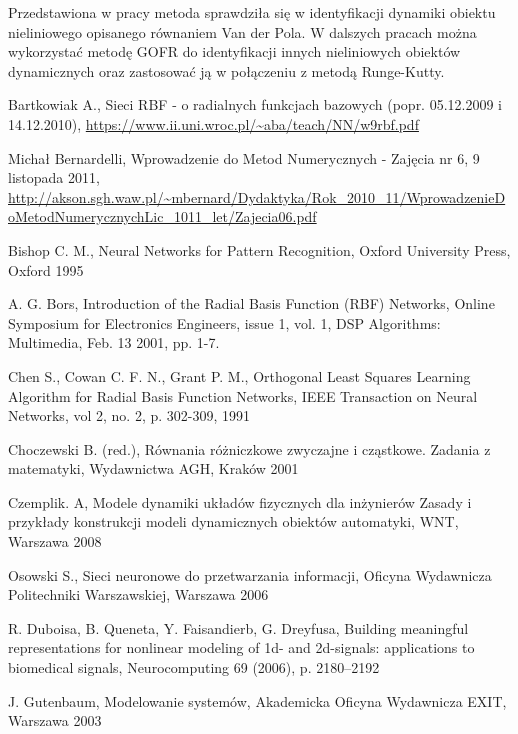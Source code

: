 Przedstawiona w pracy metoda sprawdziła się w identyfikacji dynamiki obiektu nieliniowego opisanego równaniem Van der Pola. W dalszych pracach można wykorzystać metodę GOFR do identyfikacji innych nieliniowych obiektów dynamicznych oraz zastosować ją w połączeniu z metodą Runge-Kutty\cite{Wang}.

\clearpage

\begin{thebibliography}{widest-label}

 Bartkowiak A., Sieci RBF - o radialnych funkcjach bazowych (popr. 05.12.2009 i 14.12.2010), \url{https://www.ii.uni.wroc.pl/~aba/teach/NN/w9rbf.pdf}

 Michał Bernardelli, Wprowadzenie do Metod Numerycznych -
Zajęcia nr 6, 9 listopada 2011, \url{http://akson.sgh.waw.pl/~mbernard/Dydaktyka/Rok\_2010\_11/WprowadzenieD oMetodNumerycznychLic\_1011\_let/Zajecia06.pdf}

Bishop C. M., Neural Networks for Pattern Recognition, Oxford University Press, Oxford 1995 

 A. G. Bors, Introduction of the Radial Basis Function (RBF) Networks, Online Symposium for Electronics Engineers, issue 1, vol. 1, DSP Algorithms: Multimedia, Feb. 13 2001, pp. 1-7. 

 Chen S., Cowan C. F. N., Grant P. M., Orthogonal Least Squares Learning Algorithm for Radial Basis Function Networks, IEEE Transaction on Neural Networks, vol 2, no. 2, p. 302-309, 1991

 Choczewski B. (red.), Równania różniczkowe zwyczajne i cząstkowe. Zadania z matematyki, Wydawnictwa AGH, Kraków 2001

 Czemplik. A, Modele dynamiki układów fizycznych dla inżynierów
Zasady i przykłady konstrukcji modeli dynamicznych obiektów automatyki, WNT, Warszawa 2008

Osowski S., Sieci neuronowe do przetwarzania informacji, Oficyna Wydawnicza Politechniki Warszawskiej,  Warszawa 2006

 R. Duboisa, B. Queneta, Y. Faisandierb, G. Dreyfusa, Building meaningful representations for nonlinear modeling of 1d- and 2d-signals: applications to biomedical signals, Neurocomputing 69 (2006), p. 2180–2192

 J. Gutenbaum, Modelowanie systemów, Akademicka Oficyna Wydawnicza EXIT, Warszawa 2003


\end{thebibliography}
